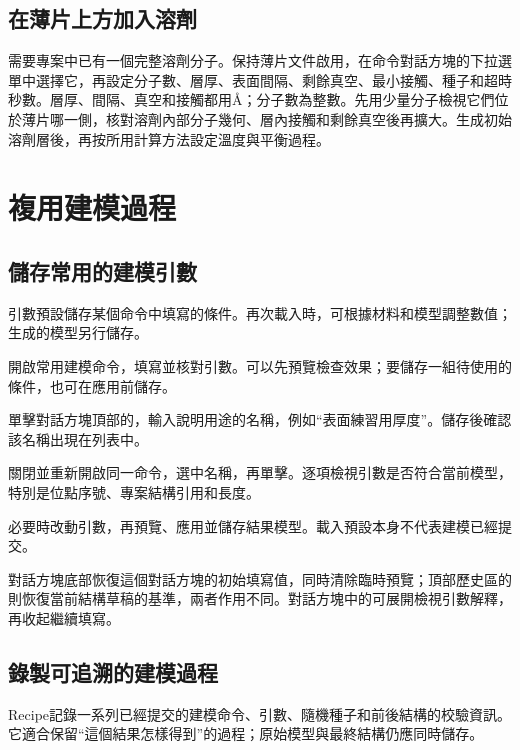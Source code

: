 \subsection{在薄片上方加入溶劑}

需要專案中已有一個完整溶劑分子。保持薄片文件啟用，在命令對話方塊的下拉選單中選擇它，再設定分子數、層厚、表面間隔、剩餘真空、最小接觸、種子和超時秒數。層厚、間隔、真空和接觸都用\AA；分子數為整數。先用少量分子檢視它們位於薄片哪一側，核對溶劑內部分子幾何、層內接觸和剩餘真空後再擴大。生成初始溶劑層後，再按所用計算方法設定溫度與平衡過程。

\section{複用建模過程}

\subsection{儲存常用的建模引數}\label{sec:modeling-preset-reference}

引數預設儲存某個命令中填寫的條件。再次載入時，可根據材料和模型調整數值；生成的模型另行儲存。

\begin{steps}
  \item 開啟常用建模命令，填寫並核對引數。可以先預覽檢查效果；要儲存一組待使用的條件，也可在應用前儲存。
  \item 單擊對話方塊頂部的，輸入說明用途的名稱，例如“表面練習用厚度”。儲存後確認該名稱出現在列表中。
  \item 關閉並重新開啟同一命令，選中名稱，再單擊。逐項檢視引數是否符合當前模型，特別是位點序號、專案結構引用和長度。
  \item 必要時改動引數，再預覽、應用並儲存結果模型。載入預設本身不代表建模已經提交。
\end{steps}

對話方塊底部恢復這個對話方塊的初始填寫值，同時清除臨時預覽；頂部歷史區的則恢復當前結構草稿的基準，兩者作用不同。對話方塊中的可展開檢視引數解釋，再收起繼續填寫。

\subsection{錄製可追溯的建模過程}\label{sec:modeling-recipe-reference}

Recipe記錄一系列已經提交的建模命令、引數、隨機種子和前後結構的校驗資訊。它適合保留“這個結果怎樣得到”的過程；原始模型與最終結構仍應同時儲存。

